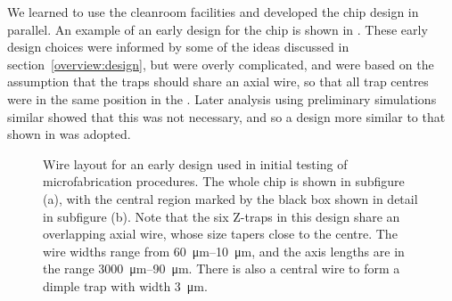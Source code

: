 We learned to use the cleanroom facilities and developed the chip design in
parallel. An example of an early design for the chip is shown in
. These early design choices were informed by
some of the ideas discussed in section~\ref{overview:design}, but were overly
complicated, and were based on the assumption that the traps should share an
axial wire, so that all trap centres were in the same position in the
\xyplane{}. Later analysis using preliminary simulations similar showed
that this was not necessary, and so a design more similar to that shown in
 was adopted.

\begin{figure}[ht]
  \begin{subfigure}[b]{0.45\textwidth}
    \centering
    \caption{}
  \end{subfigure}
  \hspace{1cm}
  \begin{subfigure}[b]{0.45\textwidth}
    \centering
    \caption{}
  \end{subfigure}
  \caption[Prototype chip layout]{
    Wire layout for an early design used in initial testing of
  microfabrication procedures. The whole chip is shown in subfigure (a), with
  the central region marked by the black box shown in detail in subfigure (b).
  Note that the six Z-traps in this design share an overlapping axial wire,
  whose size tapers close to the centre. The wire widths range from
  \SIrange{60}{10}{\micro\meter}, and the axis lengths are in the range
  \SIrange{3000}{90}{\micro\meter}. There is also a central wire to form a
  dimple trap with width \SI{3}{\micro\meter}.
  }
  \label{fab:figs:earlydesign}
\end{figure}

